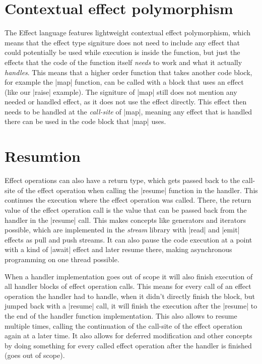 \section{Contextual effect polymorphism}

The Effect language features lightweight contextual effect polymorphism, which means that the effect type signiture does not need to include any effect that could potentially be used while execution is inside the function, but just the effects that the code of the function itself \textit{needs} to work and what it actually \textit{handles}. This means that a higher order function that takes another code block, for example the |map| function, can be called with a block that uses an effect (like our |raise| example). The signiture of |map| still does not mention any needed or handled effect, as it does not use the effect directly. This effect then needs to be handled at the \textit{call-site} of |map|, meaning any effect that is handled there can be used in the code block that |map| uses.

\section{Resumtion}

Effect operations can also have a return type, which gets passed back to the call-site of the effect operation when calling the |resume| function in the handler. This continues the execution where the effect operation was called. There, the return value of the effect operation call is the value that can be passed back from the handler in the |resume| call. This makes concepts like generators and iterators possible, which are implemented in the \textit{stream} library with |read| and |emit| effects as pull and push streams. It can also pause the code execution at a point with a kind of |await| effect and later resume there, making asynchronous programming on one thread possible.

When a handler implementation goes out of scope it will also finish execution of all handler blocks of effect operation calls. This means for every call of an effect operation the handler had to handle, when it didn't directly finish the block, but jumped back with a |resume| call, it will finish the execution after the |resume| to the end of the handler function implementation. This also allows to resume multiple times, calling the continuation of the call-site of the effect operation again at a later time. It also allows for deferred modification and other concepts by doing something for every called effect operation after the handler is finished (goes out of scope).

